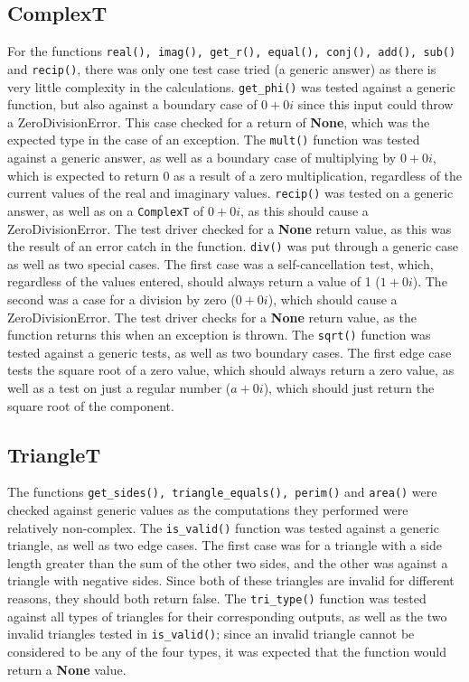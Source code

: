 \documentclass[12pt]{article}
\begin{document}
\subsection*{ComplexT}
For the functions \verb|real(), imag(), get_r(), equal(), conj(), add(), sub()| and \verb|recip()|, there was only one test case tried (a generic answer) as there is very little complexity in the calculations. \verb|get_phi()| was tested against a generic function, but also against a boundary case of $0 + 0i$ since this input could throw a ZeroDivisionError. This case checked for a return of \textbf{None}, which was the expected type in the case of an exception. The \verb|mult()| function was tested against a generic answer, as well as a boundary case of multiplying by $0 + 0i$, which is expected to return 0 as a result of a zero multiplication, regardless of the current values of the real and imaginary values. \verb|recip()| was tested on a generic answer, as well as on a \verb|ComplexT| of $0 + 0i$, as this should cause a ZeroDivisionError. The test driver checked for a \textbf{None} return value, as this was the result of an error catch in the function. \verb|div()| was put through a generic case as well as two special cases. The first case was a self-cancellation test, which, regardless of the values entered, should always return a value of 1 ($1 + 0i$). The second was a case for a division by zero ($0 + 0i$), which should cause a ZeroDivisionError. The test driver checks for a \textbf{None} return value, as the function returns this when an exception is thrown. The \verb|sqrt()| function was tested against a generic tests, as well as two boundary cases. The first edge case tests the square root of a zero value, which should always return a zero value, as well as a test on just a regular number ($a+0i$), which should just return the square root of the component.
\subsection*{TriangleT}
The functions \verb|get_sides(), triangle_equals(), perim()| and \verb|area()| were checked against generic values as the computations they performed were relatively non-complex. The \verb|is_valid()| function was tested against a generic triangle, as well as two edge cases. The first case was for a triangle with a side length greater than the sum of the other two sides, and the other was against a triangle with negative sides. Since both of these triangles are invalid for different reasons, they should both return false. The \verb|tri_type()| function was tested against all types of triangles for their corresponding outputs, as well as the two invalid triangles tested in \verb|is_valid()|; since an invalid triangle cannot be considered to be any of the four types, it was expected that the function would return a \textbf{None} value.
\end{document}
